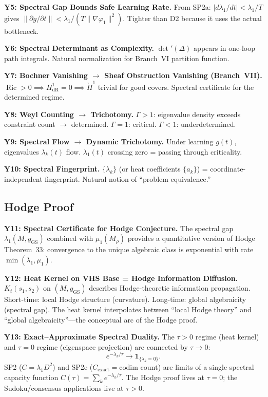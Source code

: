 \documentclass[11pt]{article}
\theoremstyle{definition}
\theoremstyle{remark}
\newcommand{\Ric}{\operatorname{Ric}}
\newcommand{\Cexact}{C_{\mathrm{exact}}}
\begin{document}
\textbf{Y5: Spectral Gap Bounds Safe Learning Rate.}
From SP2a: $|d\lambda_1/dt| < \lambda_1/T$ gives $\|\partial g/\partial t\| < \lambda_1/(T\|\nabla\varphi_1\|^2)$. Tighter than D2 because it uses the actual bottleneck.

\textbf{Y6: Spectral Determinant as Complexity.}
$\det'(\Delta)$ appears in one-loop path integrals. Natural normalization for Branch~VI partition function.

\textbf{Y7: Bochner Vanishing $\to$ Sheaf Obstruction Vanishing (Branch~VII).}
$\Ric > 0 \implies H^1_{\mathrm{dR}} = 0 \implies \check{H}^1$ trivial for good covers. Spectral certificate for the determined regime.

\textbf{Y8: Weyl Counting $\to$ Trichotomy.}
$\Gamma > 1$: eigenvalue density exceeds constraint count $\to$ determined.
$\Gamma = 1$: critical. $\Gamma < 1$: underdetermined.

\textbf{Y9: Spectral Flow $\to$ Dynamic Trichotomy.}
Under learning $g(t)$, eigenvalues $\lambda_k(t)$ flow. $\lambda_1(t)$ crossing zero = passing through criticality.

\textbf{Y10: Spectral Fingerprint.}
$\{\lambda_k\}$ (or heat coefficients $\{a_k\}$) = coordinate-independent fingerprint. Natural notion of ``problem equivalence.''

\subsection{Hodge Proof}

\textbf{Y11: Spectral Certificate for Hodge Conjecture.}
The spectral gap $\lambda_1(M, g_{\mathrm{GS}})$ combined with $\mu_1(M_\rho)$ provides a quantitative version of Hodge Theorem~33: convergence to the unique algebraic class is exponential with rate $\min(\lambda_1, \mu_1)$.

\textbf{Y12: Heat Kernel on VHS Base = Hodge Information Diffusion.}
$K_t(s_1, s_2)$ on $(M, g_{\mathrm{GS}})$ describes Hodge-theoretic information propagation. Short-time: local Hodge structure (curvature). Long-time: global algebraicity (spectral gap). The heat kernel interpolates between ``local Hodge theory'' and ``global algebraicity''---the conceptual arc of the Hodge proof.

\textbf{Y13: Exact--Approximate Spectral Duality.}
The $\tau > 0$ regime (heat kernel) and $\tau = 0$ regime (eigenspace projection) are connected by $\tau \to 0$:
\[
e^{-\lambda_k/\tau} \to \mathbf{1}_{\{\lambda_k = 0\}}.
\]
SP2 ($C = \lambda_1 D^2$) and SP2e ($\Cexact = \text{codim count}$) are limits of a single spectral capacity function $C(\tau) = \sum_k e^{-\lambda_k/\tau}$. The Hodge proof lives at $\tau = 0$; the Sudoku/consensus applications live at $\tau > 0$.
\end{document}
